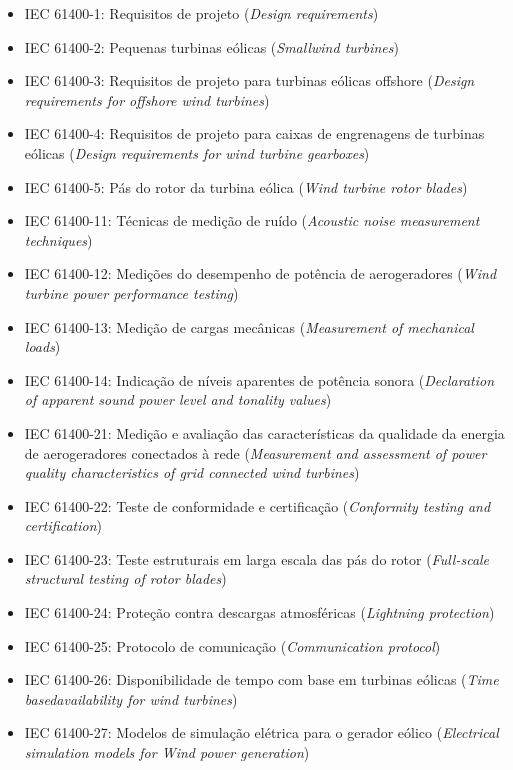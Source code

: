 \begin{itemize}
    \item IEC 61400-1: Requisitos de projeto (\textit{Design requirements})
    \item IEC 61400-2: Pequenas turbinas eólicas (\textit{Smallwind turbines})
    \item IEC 61400-3: Requisitos de projeto para turbinas eólicas offshore (\textit{Design requirements for offshore wind turbines})
    \item IEC 61400-4: Requisitos de projeto para caixas de engrenagens de turbinas eólicas (\textit{Design requirements for wind turbine gearboxes})
    \item IEC 61400-5: Pás do rotor da turbina eólica (\textit{Wind turbine rotor blades})
    \item IEC 61400-11: Técnicas de medição de ruído (\textit{Acoustic noise measurement techniques})
    \item IEC 61400-12: Medições do desempenho de potência de aerogeradores (\textit{Wind turbine power performance testing})
    \item IEC 61400-13: Medição de cargas mecânicas (\textit{Measurement of mechanical
loads})
    \item IEC 61400-14: Indicação de níveis aparentes de potência sonora (\textit{Declaration of apparent sound power level and tonality values})
    \item IEC 61400-21: Medição e avaliação das características da qualidade da energia de aerogeradores conectados à rede (\textit{Measurement and assessment of power quality characteristics of grid connected wind turbines})
    \item IEC 61400-22: Teste de conformidade e certificação (\textit{Conformity testing and certification})
    \item IEC 61400-23: Teste estruturais em larga escala das pás do rotor (\textit{Full-scale structural testing of rotor blades})
    \item IEC 61400-24: Proteção contra descargas atmosféricas (\textit{Lightning protection})
    \item IEC 61400-25: Protocolo de comunicação (\textit{Communication protocol})
    \item IEC 61400-26: Disponibilidade de tempo com base em turbinas eólicas (\textit{Time basedavailability for wind turbines})
    \item IEC 61400-27: Modelos de simulação elétrica para o gerador eólico (\textit{Electrical simulation models for Wind power generation})
\end{itemize}

